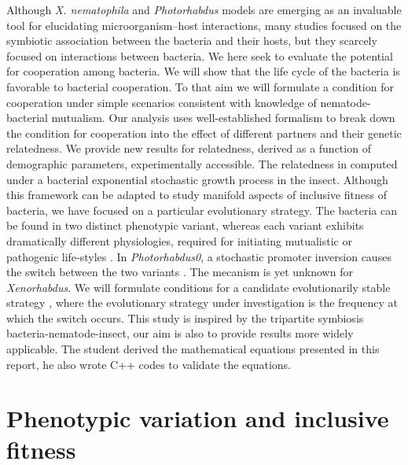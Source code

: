 \documentclass[10pt]{article}
\newcommand{\Xnema}{\textit{X. nematophila} }
\newcommand{\Photo}{\textit{Photorhabdus} }
\begin{document}
\begin{multicols}{2}
Although \Xnema and \Photo models are emerging as an invaluable tool for elucidating microorganism–host interactions,
many studies focused on the symbiotic association between the bacteria and their hosts, but they scarcely focused on interactions between bacteria.
We here seek to evaluate the potential for cooperation among bacteria.
We will show that the life cycle of the bacteria is favorable to bacterial cooperation.
To that aim we will formulate a condition for cooperation under simple scenarios consistent with knowledge of nematode-bacterial mutualism.
Our analysis uses well-established formalism to break down the condition for cooperation into the effect of different partners and their genetic relatedness.
We provide new results for relatedness, derived as a function of demographic parameters, experimentally accessible.
The relatedness in computed under a bacterial exponential stochastic growth process in the insect.
Although this framework can be adapted to study manifold aspects of inclusive fitness of bacteria, we have focused on a particular evolutionary strategy.
The bacteria can be found in two distinct phenotypic variant, whereas each variant exhibits dramatically different physiologies, required for initiating mutualistic or pathogenic life-styles \cite{Akhurst1982a,Forst1997}. 
In \textit{Photorhabdus0}, a stochastic promoter inversion causes the switch between the two variants \cite{Somvanshi2012}. The mecanism is yet unknown for \textit{Xenorhabdus}. 
We will formulate conditions for a candidate evolutionarily stable strategy \cite{lehmann2014fitness}, where the evolutionary strategy under investigation is the frequency at which the switch occurs.
This study is inspired by the tripartite symbiosis bacteria-nematode-insect, our aim is also to provide results more widely applicable.
The student derived the mathematical equations presented in this report, he also wrote C++ codes to validate the equations.
\section*{Phenotypic variation and inclusive fitness}


\end{multicols}
\end{document}
